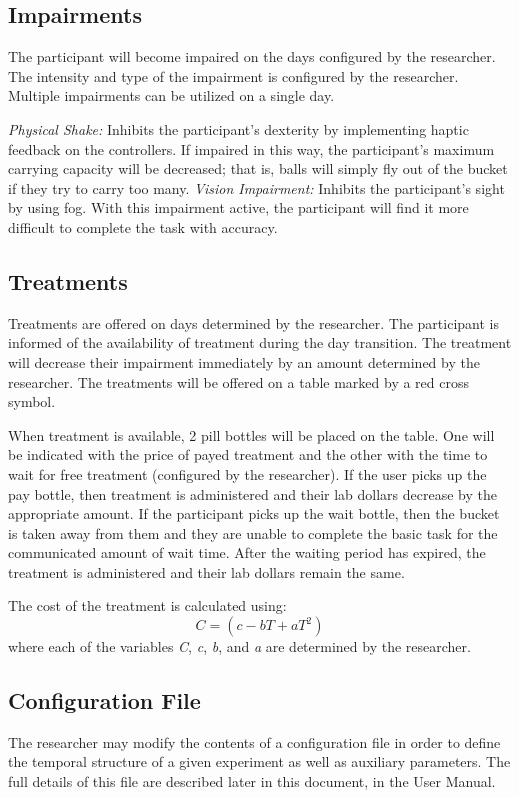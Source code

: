 \documentclass{article}
\begin{document}
\subsection{Impairments}

The participant will become impaired on the days configured by the researcher. The intensity and type of the impairment is configured by the researcher. Multiple impairments can be utilized on a single day.

\emph{Physical Shake:}  Inhibits the participant's dexterity by implementing haptic feedback on the controllers. If impaired in this way, the participant's maximum carrying capacity will be decreased; that is, balls will simply fly out of the bucket if they try to carry too many.
\emph{Vision Impairment:} Inhibits the participant’s sight by using fog. With this impairment active, the participant will find it more difficult to complete the task with accuracy.

\subsection{Treatments}

Treatments are offered on days determined by the researcher. The participant is informed of the availability of treatment during the day transition. The treatment will decrease their impairment immediately by an amount determined by the researcher. The treatments will be offered on a table marked by a red cross symbol.

When treatment is available, 2 pill bottles will be placed on the table. One will be indicated with the price of payed treatment and the other with the time to wait for free treatment (configured by the researcher). If the user picks up the pay bottle, then treatment is administered and their lab dollars decrease by the appropriate amount. If the participant picks up the wait bottle, then the bucket is taken away from them and they are unable to complete the basic task for the communicated amount of wait time. After the waiting period has expired, the treatment is administered and their lab dollars remain the same.\newline

The cost of the treatment is calculated using: 
\[ C = (c - bT + aT^2)\]
where each of the variables \textit{C}, \textit{c}, \textit{b}, and \textit{a} are determined by the researcher.


\subsection{Configuration File}
The researcher may modify the contents of a configuration file in order to define the temporal structure of a given experiment as well as auxiliary parameters. The full details of this file are described later in this document, in the User Manual.
\end{document}

